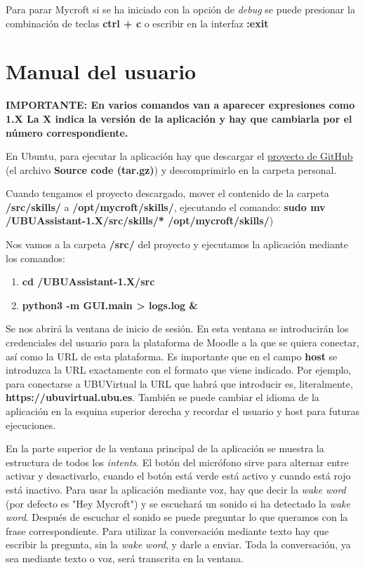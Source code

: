 Para parar Mycroft si se ha iniciado con la opción de \textit{debug} se puede presionar la combinación de teclas \textbf{ctrl + c} o escribir en la interfaz \textbf{:exit}


\section{Manual del usuario}

\textbf{IMPORTANTE: En varios comandos van a aparecer expresiones como 1.X La X indica la versión de la aplicación y hay que cambiarla por el número correspondiente.}

En Ubuntu, para ejecutar la aplicación hay que descargar el \href{https://github.com/adp1002/UBUAssistant/releases}{proyecto de GitHub} (el archivo \textbf{Source code (tar.gz)}) y  descomprimirlo en la carpeta personal.


Cuando tengamos el proyecto descargado, mover el contenido de la carpeta \textbf{\detokenize{~}/src/skills/} a \textbf{/opt/mycroft/skills/}, ejecutando el comando:
\textbf{sudo mv \detokenize{~}/UBUAssistant-1.X/src/skills/* /opt/mycroft/skills/})

Nos vamos a la carpeta \textbf{/src/} del proyecto y ejecutamos la aplicación mediante los comandos:
\begin{enumerate}
	\item \textbf{cd \detokenize{~}/UBUAssistant-1.X/src}
	\item \textbf{python3 -m GUI.main \detokenize{>}> logs.log \&}
\end{enumerate}
Se nos abrirá la ventana de inicio de sesión. En esta ventana se introducirán los credenciales del usuario para la plataforma de Moodle a la que se quiera conectar, así como la URL de esta plataforma.
Es importante que en el campo \textbf{host} se introduzca la URL exactamente con el formato que viene indicado. Por ejemplo, para conectarse a UBUVirtual la URL que habrá que introducir es, literalmente, \textbf{https://ubuvirtual.ubu.es}.
También se puede cambiar el idioma de la aplicación en la esquina superior derecha y recordar el usuario y host para futuras ejecuciones.


En la parte superior de la ventana principal de la aplicación se muestra la estructura de todos los \textit{intents}. El botón del micrófono sirve para alternar entre activar y desactivarlo, cuando el botón está verde está activo y cuando está rojo está inactivo.
Para usar la aplicación mediante voz, hay que decir la \textit{wake word} (por defecto es "Hey Mycroft") y se escuchará un sonido si ha detectado la \textit{wake word}. Después de escuchar el sonido se puede preguntar lo que queramos con la frase correspondiente. Para utilizar la conversación mediante texto hay que escribir la pregunta, sin la \textit{wake word}, y darle a enviar. Toda la conversación, ya sea mediante texto o voz, será transcrita en la ventana.

